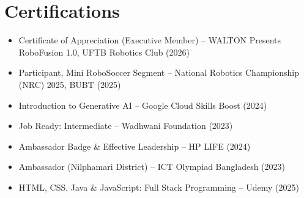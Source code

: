 \documentclass[11pt,a4paper]{article}
\begin{document}
\section*{Certifications}
\begin{itemize}
    \item Certificate of Appreciation (Executive Member) -- WALTON Presents RoboFusion 1.0, UFTB Robotics Club (2026)
    \item Participant, Mini RoboSoccer Segment -- National Robotics Championship (NRC) 2025, BUBT (2025)
    \item Introduction to Generative AI -- Google Cloud Skills Boost (2024)
    \item Job Ready: Intermediate -- Wadhwani Foundation (2023)
    \item Ambassador Badge \& Effective Leadership -- HP LIFE (2024)
    \item Ambassador (Nilphamari District) -- ICT Olympiad Bangladesh (2023)
    \item HTML, CSS, Java \& JavaScript: Full Stack Programming -- Udemy (2025)
\end{itemize}
\end{document}
